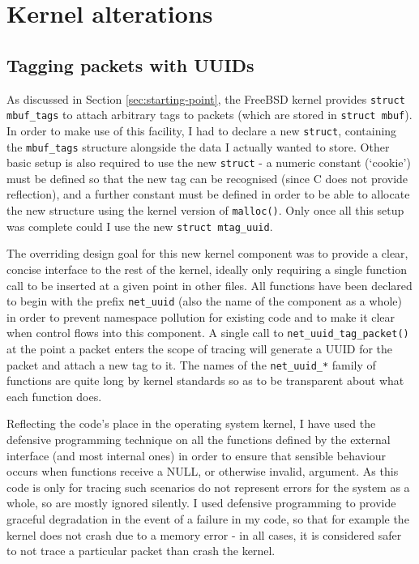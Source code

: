 \documentclass[a4paper,12pt,twoside,openright]{report}
\begin{document}
	\section{Kernel alterations}
	
	\subsection{Tagging packets with UUIDs}
	
	As discussed in Section \ref{sec:starting-point}, the FreeBSD kernel provides \verb|struct mbuf_tags| to attach arbitrary tags to packets (which are stored in \verb|struct mbuf|). In order to make use of this facility, I had to declare a new \verb|struct|, containing the \verb|mbuf_tags| structure alongside the data I actually wanted to store. Other basic setup is also required to use the new \verb|struct| - a numeric constant (`cookie') must be defined so that the new tag can be recognised (since C does not provide reflection), and a further constant must be defined in order to be able to allocate the new structure using the kernel version of \verb|malloc()|. Only once all this setup was complete could I use the new \verb|struct mtag_uuid|.
	
	The overriding design goal for this new kernel component was to provide a clear, concise interface to the rest of the kernel, ideally only requiring a single function call to be inserted at a given point in other files. All functions have been declared to begin with the prefix \verb|net_uuid| (also the name of the component as a whole) in order to prevent namespace pollution for existing code and to make it clear when control flows into this component. A single call to \verb|net_uuid_tag_packet()| at the point a packet enters the scope of tracing will generate a UUID for the packet and attach a new tag to it. The names of the \verb|net_uuid_*| family of functions are quite long by kernel standards so as to be transparent about what each function does.
	
	Reflecting the code's place in the operating system kernel, I have used the defensive programming technique on all the functions defined by the external interface (and most internal ones) in order to ensure that sensible behaviour occurs when functions receive a NULL, or otherwise invalid, argument. As this code is only for tracing such scenarios do not represent errors for the system as a whole, so are mostly ignored silently. I used defensive programming to provide graceful degradation in the event of a failure in my code, so that for example the kernel does not crash due to a memory error - in all cases, it is considered safer to not trace a particular packet than crash the kernel.
	
\end{document}
